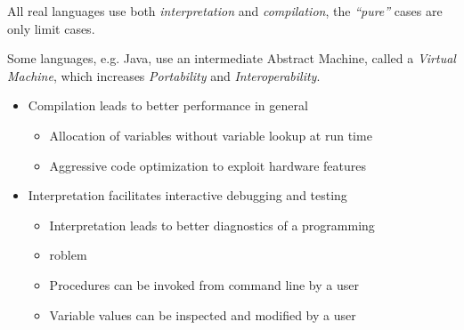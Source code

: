 All real languages use both \textit{interpretation} and \textit{compilation}, the \textit{``pure''} cases are only limit cases.

Some languages, e.g. Java, use an intermediate Abstract Machine, called a \textit{Virtual Machine},
which increases \textit{Portability} and \textit{Interoperability}.

\begin{itemize}
	\item Compilation leads to better performance in general
	    \begin{itemize}
		    \item Allocation of variables without variable lookup at run time
		    \item Aggressive code optimization to exploit hardware features
	    \end{itemize}
	\item Interpretation facilitates interactive debugging and testing
	    \begin{itemize}
		    \item Interpretation leads to better diagnostics of a programming
		    \item roblem
		    \item Procedures can be invoked from command line by a user
		    \item Variable values can be inspected and modified by a user
	    \end{itemize}
\end{itemize}
